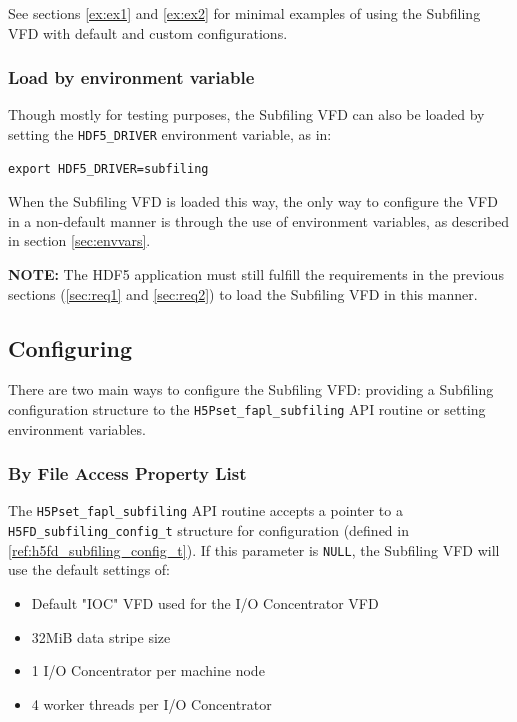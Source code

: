 \documentclass[../main.tex]{subfiles}
\begin{document}
See sections \ref{ex:ex1} and \ref{ex:ex2} for minimal examples of using the Subfiling VFD with
default and custom configurations.

\subsubsection{Load by environment variable}

Though mostly for testing purposes, the Subfiling VFD can also be loaded by setting
the \texttt{HDF5\_DRIVER} environment variable, as in:

\begin{verbatim}
export HDF5_DRIVER=subfiling
\end{verbatim}

When the Subfiling VFD is loaded this way, the only way to configure the VFD in a non-default
manner is through the use of environment variables, as described in section \ref{sec:envvars}.

\textbf{NOTE:} The HDF5 application must still fulfill the requirements in the previous
sections (\ref{sec:req1} and \ref{sec:req2}) to load the Subfiling VFD in this manner.

\subsection{Configuring}

There are two main ways to configure the Subfiling VFD: providing a Subfiling configuration
structure to the \texttt{H5Pset\_fapl\_subfiling} API routine or setting environment variables.

\subsubsection{By File Access Property List}

The \texttt{H5Pset\_fapl\_subfiling} API routine accepts a pointer to a \texttt{H5FD\_subfiling\_config\_t}
structure for configuration (defined in \ref{ref:h5fd_subfiling_config_t}). If this parameter
is \texttt{NULL}, the Subfiling VFD will use the default settings of:

\begin{itemize}
\item Default "IOC" VFD used for the I/O Concentrator VFD
\item 32MiB data stripe size
\item 1 I/O Concentrator per machine node
\item 4 worker threads per I/O Concentrator
\end{itemize}
\end{document}
